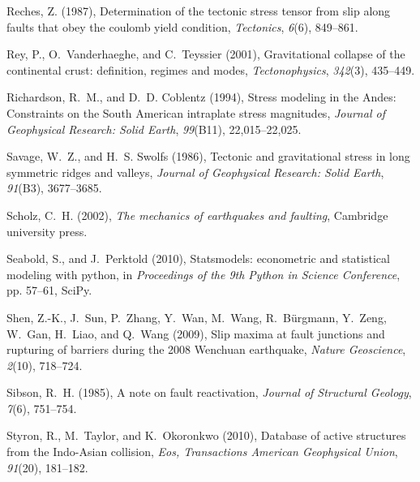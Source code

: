 \documentclass[twocolumn,jgrga]{AGUTeX}
\begin{document}
\begin{article}
{{\begin{thebibliography}{85}
Reches, Z. (1987), Determination of the tectonic stress tensor from slip along
  faults that obey the coulomb yield condition, \textit{Tectonics},
  \textit{6}(6), 849--861.

Rey, P., O.~Vanderhaeghe, and C.~Teyssier (2001), Gravitational collapse of the
  continental crust: definition, regimes and modes, \textit{Tectonophysics},
  \textit{342}(3), 435--449.

Richardson, R.~M., and D.~D. Coblentz (1994), Stress modeling in the {A}ndes:
  Constraints on the {S}outh {A}merican intraplate stress magnitudes,
  \textit{Journal of Geophysical Research: Solid Earth}, \textit{99}(B11),
  22,015--22,025.

Savage, W.~Z., and H.~S. Swolfs (1986), Tectonic and gravitational stress in
  long symmetric ridges and valleys, \textit{Journal of Geophysical Research:
  Solid Earth}, \textit{91}(B3), 3677--3685.

Scholz, C.~H. (2002), \textit{The mechanics of earthquakes and faulting},
  Cambridge university press.

Seabold, S., and J.~Perktold (2010), Statsmodels: econometric and statistical
  modeling with python, in \textit{Proceedings of the 9th Python in Science
  Conference}, pp. 57--61, SciPy.

Shen, Z.-K., J.~Sun, P.~Zhang, Y.~Wan, M.~Wang, R.~B{\"u}rgmann, Y.~Zeng,
  W.~Gan, H.~Liao, and Q.~Wang (2009), Slip maxima at fault junctions and
  rupturing of barriers during the 2008 {W}enchuan earthquake, \textit{Nature
  Geoscience}, \textit{2}(10), 718--724.

Sibson, R.~H. (1985), A note on fault reactivation, \textit{Journal of
  Structural Geology}, \textit{7}(6), 751--754.

Styron, R., M.~Taylor, and K.~Okoronkwo (2010), Database of active structures
  from the {I}ndo-{A}sian collision, \textit{Eos, Transactions American
  Geophysical Union}, \textit{91}(20), 181--182.


\end{thebibliography}}}
\end{article}
\end{document}
